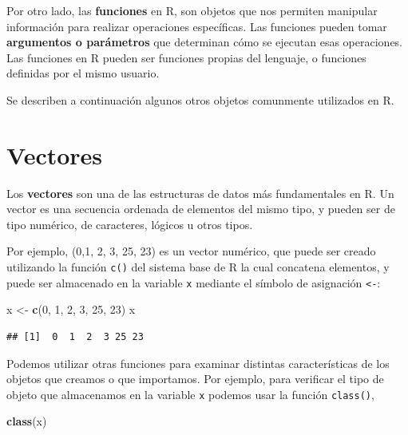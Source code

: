 \documentclass[
]{book}
\newenvironment{Shaded}{\begin{snugshade}}{\end{snugshade}}
\newcommand{\DecValTok}[1]{\textcolor[rgb]{0.00,0.00,0.81}{#1}}
\newcommand{\FunctionTok}[1]{\textcolor[rgb]{0.13,0.29,0.53}{\textbf{#1}}}
\newcommand{\NormalTok}[1]{#1}
\newcommand{\OtherTok}[1]{\textcolor[rgb]{0.56,0.35,0.01}{#1}}
\begin{document}
Por otro lado, las \textbf{funciones} en R, son objetos que nos permiten manipular información para realizar operaciones específicas. Las funciones pueden tomar \textbf{argumentos o parámetros} que determinan cómo se ejecutan esas operaciones. Las funciones en R pueden ser funciones propias del lenguaje, o funciones definidas por el mismo usuario.

Se describen a continuación algunos otros objetos comunmente utilizados en R.

\hypertarget{vectores}{%
\section{Vectores}\label{vectores}}

Los \textbf{vectores} son una de las estructuras de datos más fundamentales en R. Un vector es una secuencia ordenada de elementos del mismo tipo, y pueden ser de tipo numérico, de caracteres, lógicos u otros tipos.

Por ejemplo, (0,1, 2, 3, 25, 23) es un vector numérico, que puede ser creado utilizando la función \texttt{c()} del sistema base de R la cual concatena elementos, y puede ser almacenado en la variable \texttt{x} mediante el símbolo de asignación \texttt{\textless{}-}:

\begin{Shaded}
\begin{Highlighting}[]
\NormalTok{x }\OtherTok{\textless{}{-}} \FunctionTok{c}\NormalTok{(}\DecValTok{0}\NormalTok{, }\DecValTok{1}\NormalTok{, }\DecValTok{2}\NormalTok{, }\DecValTok{3}\NormalTok{, }\DecValTok{25}\NormalTok{, }\DecValTok{23}\NormalTok{)}
\NormalTok{x}
\end{Highlighting}
\end{Shaded}

\begin{verbatim}
## [1]  0  1  2  3 25 23
\end{verbatim}

Podemos utilizar otras funciones para examinar distintas características de los objetos que creamos o que importamos. Por ejemplo, para verificar el tipo de objeto que almacenamos en la variable \texttt{x} podemos usar la función \texttt{class()},

\begin{Shaded}
\begin{Highlighting}[]
\FunctionTok{class}\NormalTok{(x)}
\end{Highlighting}
\end{Shaded}
\end{document}
